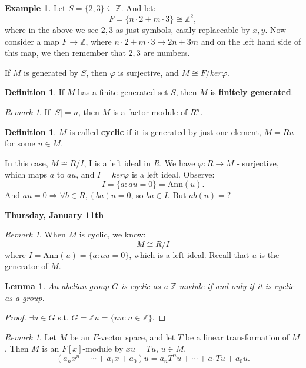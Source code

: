 \documentclass[9pt,reqno,twoside]{amsbook}
\theoremstyle{plain}
\numberwithin{section}{chapter}
\numberwithin{equation}{chapter}
\newtheorem{lem}[theorem]{Lemma}
\theoremstyle{definition}
\newtheorem{Def}[theorem]{Definition}
\newtheorem{Ex}[theorem]{Example}
\theoremstyle{remark}
\newtheorem{rem}[theorem]{Remark}
\theoremstyle{plain}
\newcommand{\sub}{\subseteq}
\newcommand{\z}{\mathbb{Z}}
\renewcommand{\phi}{\varphi}
\begin{document}
\begin{Ex}
Let $S = \{2,3\} \sub \z$. And let:
$$
F = \{n\cdot 2 + m \cdot 3\} \cong \z^2,
$$
where in the above we see $2,3$ as just symbols, easily replaceable by $x,y$. Now consider a map $F \to \z$, where $n\cdot 2 + m \cdot 3 \to 2n + 3m$ and on the left hand side of this map, we then remember that $2,3$ are numbers. 
\end{Ex}




If $M$ is generated by $S$, then $\phi$ is surjective, and $M \cong F/ker\phi$. 

\begin{Def}
If $M$ has a finite generated set $S$, then $M$ is \textbf{finitely generated}. 
\end{Def}

\begin{rem}
If $|S| = n$, then $M$ is a factor module of $R^n$. 
\end{rem}

\begin{Def}
$M$ is called \textbf{cyclic} if it is generated by just one element, $M = Ru$ for some $u \in M$. 
\end{Def}
In this case, $M \cong R/I$, I is a left ideal in $R$. We have $\phi:R \to M$ - surjective, which maps $a$ to $au$, and $I = ker\phi$ is a left ideal. Observe: 
$$
I = \{a: au = 0\} = \text{Ann}(u). 
$$
And $au = 0 \Rightarrow \forall b \in R, (ba)u = 0$, so $ba \in I$. But $ab(u) = ?$

\textbf{Thursday, January 11th}

\begin{rem}
When $M$ is cyclic, we know:
$$
M \cong R/I
$$
where $I = \text{Ann}(u) = \{a:au = 0\}$, which is a left ideal. Recall that $u$ is the generator of $M$. 
\end{rem}

\begin{lem}
An abelian group $G$ is cyclic as a $\z$-module if and only if it is cyclic as a group. 
\end{lem}
\begin{proof}
$\exists u \in G$ s.t. $G = \z u = \{nu:n \in \z\}$. 
\end{proof}

\begin{rem}
Let $M$ be an $F$-vector space, and let $T$ be a linear transformation of $M$. Then $M$ is an $F[x]$-module by $xu = Tu$, $u \in M$. 
$$
(a_nx^n + \cdots + a_1x + a_0)u = a_nT^nu + \cdots + a_1Tu + a_0u.
$$
\end{rem}
\end{document}
